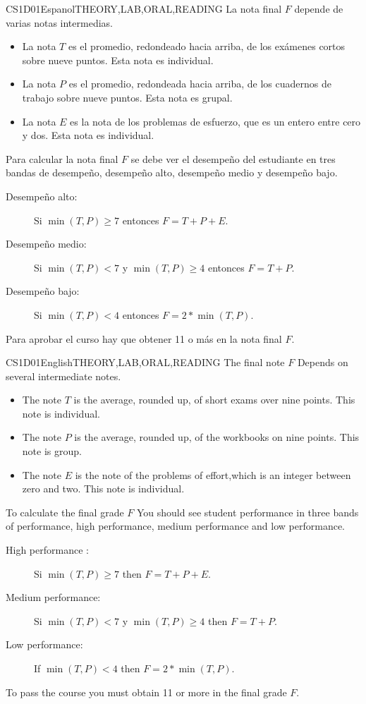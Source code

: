 \begin{evaluation}{CS1D01}{Espanol}{THEORY,LAB,ORAL,READING}
La nota final $F$ depende de varias notas intermedias.
	\begin{itemize}
		\item La nota $T$ es el promedio, redondeado hacia arriba, de los exámenes cortos sobre nueve puntos. Esta nota es individual.
		\item La nota $P$ es el promedio, redondeada hacia arriba, de los cuadernos de trabajo sobre nueve puntos. Esta nota es grupal.
		\item La nota $E$ es la nota de los problemas de esfuerzo, que es un entero entre cero y dos. Esta nota es individual.
	\end{itemize}

	Para calcular la nota final $F$ se debe ver el desempeño del estudiante en tres bandas de desempeño, desempeño alto, desempeño medio y desempeño bajo.
	\begin{description}
		\item[Desempeño alto:] Si $\min(T,P)\geq 7$ entonces $F=T+P+E$.
		\item[Desempeño medio:] Si $\min(T,P)<7$ y $\min(T,P)\geq4$ entonces $F=T+P$.
		\item[Desempeño bajo:] Si $\min(T,P)<4$ entonces $F=2*\min(T,P)$.
	\end{description}

	Para aprobar el curso hay que obtener 11 o más en la nota final $F$.
\end{evaluation}

\begin{evaluation}{CS1D01}{English}{THEORY,LAB,ORAL,READING}
The final note $F$ Depends on several intermediate notes.
	\begin{itemize}
		\item The note $T$ is the average, rounded up, of short exams over nine points. This note is individual.
		\item The note $P$ is the average, rounded up, of the workbooks on nine points. This note is group.
		\item The note $E$ is the note of the problems of effort,which is an integer between zero and two. This note is individual.
	\end{itemize}

	To calculate the final grade $F$ You should see student performance in three bands of performance, high performance, medium performance and low performance.
	\begin{description}
		\item[High performance :] Si $\min(T,P)\geq 7$ then $F=T+P+E$.
		\item[Medium performance:] Si $\min(T,P)<7$ y $\min(T,P)\geq4$ then $F=T+P$.
		\item[Low performance:] If $\min(T,P)<4$ then $F=2*\min(T,P)$.
	\end{description}

	To pass the course you must obtain 11 or more in the final grade $F$.
\end{evaluation}

